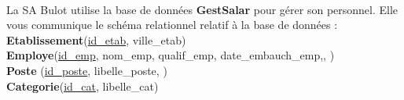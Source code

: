 \documentclass[a4paper,12pt]{article}
\begin{document}

\exo{}\\

La SA Bulot utilise la base de données \textbf{GestSalar} pour gérer son personnel. Elle vous communique le schéma relationnel relatif à la base de données :\\

\textbf{Etablissement}(\uline{id\_etab}, ville\_etab)\\

\textbf{Employe}(\uline{id\_emp}, nom\_emp, qualif\_emp, date\_embauch\_emp,, )\\

\textbf{Poste} (\uline{id\_poste}, libelle\_poste, )\\

\textbf{Categorie}(\uline{id\_cat}, libelle\_cat)\\
\end{document}
